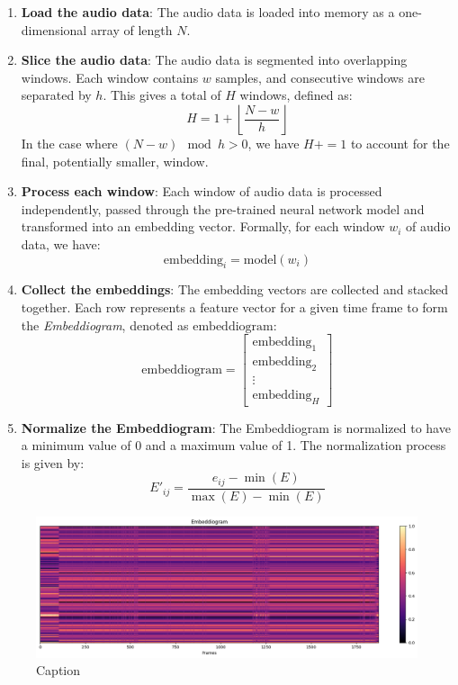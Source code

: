 \begin{enumerate}
\item \textbf{Load the audio data}: The audio data is loaded into memory as a one-dimensional array of length $N$.

\item \textbf{Slice the audio data}: The audio data is segmented into overlapping windows. Each window contains $w$ samples, and consecutive windows are separated by $h$. This gives a total of $H$ windows, defined as:
\begin{equation}
H = 1 + \left\lfloor \frac{N - w}{h} \right\rfloor
\end{equation}
In the case where $\left( N - w \right) \mod h > 0$, we have $H += 1$ to account for the final, potentially smaller, window.

\item \textbf{Process each window}: Each window of audio data is processed independently, passed through the pre-trained neural network model and transformed into an embedding vector. Formally, for each window $w_i$ of audio data, we have:
\begin{equation}
\text{embedding}_i = \text{model}(w_i)
\end{equation}

\item \textbf{Collect the embeddings}: The embedding vectors are collected and stacked together. Each row represents a feature vector for a given time frame to form the \textit{Embeddiogram}, denoted as $\text{embeddiogram}$:
\begin{equation}
\text{embeddiogram} = \begin{bmatrix} \text{embedding}_1 \\ \text{embedding}_2 \\ \vdots \\ \text{embedding}_H \end{bmatrix}
\end{equation}

\item \textbf{Normalize the Embeddiogram}: The Embeddiogram is normalized to have a minimum value of 0 and a maximum value of 1. The normalization process is given by:
\begin{equation}
E'_{ij} = \frac{e_{ij} - \min(E)}{\max(E) - \min(E)}
\end{equation}
\end{enumerate}

\begin{figure}
    \centering
    \includegraphics[width=\textwidth]{figures/images/embeddiogram_SALAMI_track_2.png}
    \caption[Embeddiogram]{Caption}
    \label{fig:embeddiogram}
\end{figure}
